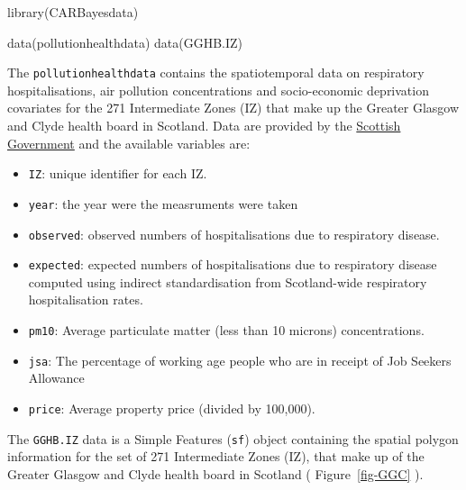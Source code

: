 \documentclass[
  letterpaper,
  DIV=11,
  numbers=noendperiod]{scrartcl}
\newenvironment{Shaded}{\begin{snugshade}}{\end{snugshade}}
\newcommand{\FunctionTok}[1]{\textcolor[rgb]{0.28,0.35,0.67}{#1}}
\newcommand{\NormalTok}[1]{\textcolor[rgb]{0.00,0.23,0.31}{#1}}
\providecommand{\tightlist}{%
  \setlength{\itemsep}{0pt}\setlength{\parskip}{0pt}}\usepackage{longtable,booktabs,array}
\begin{document}
\begin{Shaded}
\begin{Highlighting}[]
\FunctionTok{library}\NormalTok{(CARBayesdata)}

\FunctionTok{data}\NormalTok{(pollutionhealthdata)}
\FunctionTok{data}\NormalTok{(GGHB.IZ)}
\end{Highlighting}
\end{Shaded}

The \texttt{pollutionhealthdata} contains the spatiotemporal data on
respiratory hospitalisations, air pollution concentrations and
socio-economic deprivation covariates for the 271 Intermediate Zones
(IZ) that make up the Greater Glasgow and Clyde health board in
Scotland. Data are provided by the
\href{http://statistics.gov.scot.}{Scottish Government} and the
available variables are:

\begin{itemize}
\tightlist
\item
  \texttt{IZ}: unique identifier for each IZ.
\item
  \texttt{year}: the year were the measruments were taken
\item
  \texttt{observed}: observed numbers of hospitalisations due to
  respiratory disease.
\item
  \texttt{expected}: expected numbers of hospitalisations due to
  respiratory disease computed using indirect standardisation from
  Scotland-wide respiratory hospitalisation rates.
\item
  \texttt{pm10}: Average particulate matter (less than 10 microns)
  concentrations.
\item
  \texttt{jsa}: The percentage of working age people who are in receipt
  of Job Seekers Allowance
\item
  \texttt{price}: Average property price (divided by 100,000).
\end{itemize}

The \texttt{GGHB.IZ} data is a Simple Features (\texttt{sf}) object
containing the spatial polygon information for the set of 271
Intermediate Zones (IZ), that make up of the Greater Glasgow and Clyde
health board in Scotland ( Figure~\ref{fig-GGC} ).
\end{document}
